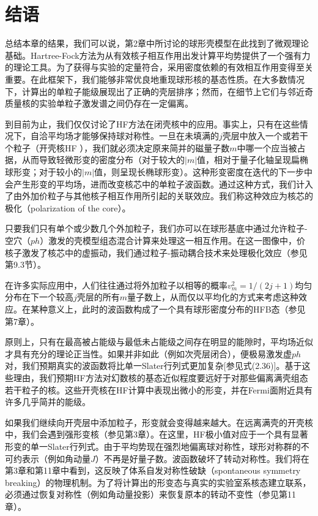 \section{结语\label{sec:=007ED3=008BED}}

总结本章的结果，我们可以说，第2章中所讨论的球形壳模型在此找到了微观理论基础。Hartree-Fock方法为从有效核子相互作用出发计算平均势提供了一个强有力的理论工具。为了获得与实验的定量符合，采用密度依赖的有效相互作用变得至关重要。在此框架下，我们能够非常优良地重现球形核的基态性质。在大多数情况下，计算出的单粒子能级展现出了正确的壳层排序；然而，在细节上它们与邻近奇质量核的实验单粒子激发谱之间仍存在一定偏离。

到目前为止，我们仅仅讨论了HF方法在闭壳核中的应用。事实上，只有在这些情况下，自洽平均场才能够保持球对称性。一旦在未填满的$j$壳层中放入一个或若干个粒子（开壳核HF
\cite{Ke63}），我们就必须决定原来简并的磁量子数$m$中哪一个应当被占据，从而导致轻微形变的密度分布（对于较大的$|m|$值，相对于量子化轴呈现扁椭球形变；对于较小的$|m|$值，则呈现长椭球形变）。这种形变密度在迭代的下一步中会产生形变的平均场，进而改变核芯中的单粒子波函数。通过这种方式，我们计入了由外加价粒子与其他核子相互作用所引起的关联效应。我们称这种效应为核芯的极化（polarization
of the core）。

只要我们只有单个或少数几个外加粒子，我们亦可以在球形基底中通过允许粒子-空穴（$ph$）激发的壳模型组态混合计算来处理这一相互作用。在这一图像中，价核子激发了核芯中的虚振动，我们通过粒子-振动耦合技术来处理极化效应（参见第9.3节）。

在许多实际应用中，人们往往通过将外加粒子以相等的概率$v^{2}_{m}=1/(2j+1)$均匀分布在下一个较高$j$壳层的所有$m$量子数上，从而仅以平均化的方式来考虑这种效应。在某种意义上，此时的波函数构成了一个具有球形密度分布的HFB态（参见第7章）。

原则上，只有在最高被占能级与最低未占能级之间存在明显的能隙时，平均场近似才具有充分的理论正当性。如果并非如此（例如次壳层闭合），便极易激发虚$ph$对，我们预期真实的波函数将比单一Slater行列式更加复杂{[}参见式(2.36){]}。基于这些理由，我们预期HF方法对幻数核的基态近似程度要远好于对那些偏离满壳组态若干粒子的核。这些开壳核在HF计算中表现出微小的形变，并在Fermi面附近具有许多几乎简并的能级。

如果我们继续向开壳层中添加粒子，形变就会变得越来越大。在远离满壳的开壳核中，我们会遇到强形变核（参见第3章）。在这里，HF极小值对应于一个具有显著形变的单一Slater行列式。由于平均势现在强烈地偏离球对称性，球形对称群的不可约表示（例如角动量$J$）不再是好量子数。波函数破坏了转动对称性。我们将在第3章和第11章中看到，这反映了体系自发对称性破缺（spontaneous
symmetry breaking）的物理机制。为了将计算出的形变态与真实的实验室系核态建立联系，必须通过恢复对称性（例如角动量投影）来恢复原本的转动不变性（参见第11章）。

